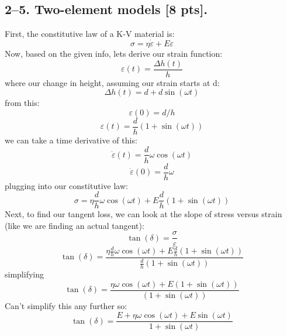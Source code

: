 \bigskip
\subsection*{2--5. \textbf{Two-element models} [8 pts].}
First, the constitutive law of a K-V material is:
\begin{equation}
    \sigma = \eta\dot{\varepsilon}+E\varepsilon
\end{equation}
Now, based on the given info, lets derive our strain function:
\begin{equation}
    \varepsilon(t)=\frac{\Delta h(t)}{h}
\end{equation}
where our change in height, assuming our strain starts at d:
\begin{equation}
    \Delta h(t) = d+d\sin(\omega t)
\end{equation}
from this:
\begin{equation}
    \varepsilon(0) = d/h
\end{equation}
\begin{equation}
    \varepsilon(t) = \frac{d}{h}(1+\sin(\omega t))
\end{equation}
we can take a time derivative of this:
\begin{equation}
    \dot{\varepsilon}(t) = \frac{d}{h}\omega \cos(\omega t)
\end{equation}
\begin{equation}
    \dot{\varepsilon}(0) = \frac{d}{h}\omega 
\end{equation}
plugging into our constitutive law:
\begin{equation}
    \boxed{\sigma = \eta\frac{d}{h}\omega \cos(\omega t)+E\frac{d}{h}(1+\sin(\omega t))}
\end{equation}
Next, to find our tangent loss, we can look at the slope of stress versus strain (like we are finding an actual tangent):
\begin{equation}
    \tan(\delta) = \frac{\sigma}{\varepsilon}
\end{equation}
\begin{equation}
    \tan(\delta) = \frac{\eta\frac{d}{h}\omega \cos(\omega t)+E\frac{d}{h}(1+\sin(\omega t))}{\frac{d}{h}(1+\sin(\omega t))}
\end{equation}
simplifying
\begin{equation}
    \tan(\delta) = \frac{\eta\omega \cos(\omega t)+E(1+\sin(\omega t))}{(1+\sin(\omega t))}
\end{equation}
Can't simplify this any further so:
\begin{equation}
    \boxed{\tan(\delta) = \frac{E+\eta\omega \cos(\omega t)+E\sin(\omega t)}{1+\sin(\omega t)}}
\end{equation}
